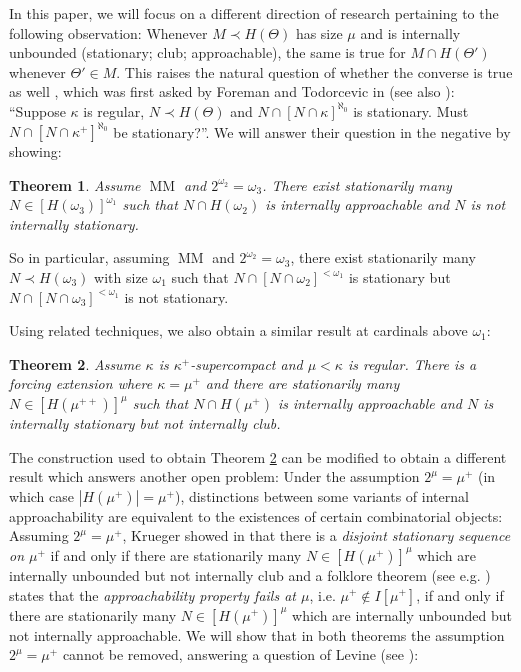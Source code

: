 \documentclass[a4paper]{amsart}
\theoremstyle{definition}
\theoremstyle{remark}
\theoremstyle{plain}
\newtheorem{mythm}{Theorem}
\numberwithin{mydef}{section}
\DeclareMathOperator{\MM}{MM}
\begin{document}
	In this paper, we will focus on a different direction of research pertaining to the following observation: Whenever $M\prec H(\Theta)$ has size $\mu$ and is internally unbounded (stationary; club; approachable), the same is true for $M\cap H(\Theta')$ whenever $\Theta'\in M$. This raises the natural question of whether the converse is true as well , which was first asked by Foreman and Todorcevic in \cite{ForemanTodorLowenheimSkolem} (see also \cite[Question 4.6]{ForemanSurvey}): ``Suppose $\kappa$ is regular, $N\prec H(\Theta)$ and $N\cap[N\cap\kappa]^{\aleph_0}$ is stationary. Must $N\cap[N\cap\kappa^+]^{\aleph_0}$ be stationary?''. We will answer their question in the negative by showing:
	
	\begin{mythm}\label{Thm1}
		Assume $\MM$ and $2^{\omega_2}=\omega_3$. There exist stationarily many $N\in[H(\omega_3)]^{\omega_1}$ such that $N\cap H(\omega_2)$ is internally approachable and $N$ is not internally stationary.
	\end{mythm}
	
	So in particular, assuming $\MM$ and $2^{\omega_2}=\omega_3$, there exist stationarily many $N\prec H(\omega_3)$ with size $\omega_1$ such that $N\cap[N\cap\omega_2]^{<\omega_1}$ is stationary but $N\cap [N\cap\omega_3]^{<\omega_1}$ is not stationary.
	
	Using related techniques, we also obtain a similar result at cardinals above $\omega_1$:
	
	\begin{mythm}\label{Thm2}
		Assume $\kappa$ is $\kappa^+$-supercompact and $\mu<\kappa$ is regular. There is a forcing extension where $\kappa=\mu^+$ and there are stationarily many $N\in[H(\mu^{++})]^{\mu}$ such that $N\cap H(\mu^+)$ is internally approachable and $N$ is internally stationary but not internally club.
	\end{mythm}
	
	The construction used to obtain Theorem \ref{Thm2} can be modified to obtain a different result which answers another open problem: Under the assumption $2^{\mu}=\mu^+$ (in which case $|H(\mu^+)|=\mu^+$), distinctions between some variants of internal approachability are equivalent to the existences of certain combinatorial objects: Assuming $2^{\mu}=\mu^+$, Krueger showed in \cite[Theorem 6.5]{KruegerApplicMSI} that there is a \emph{disjoint stationary sequence on $\mu^+$} if and only if there are stationarily many $N\in[H(\mu^+)]^{\mu}$ which are internally unbounded but not internally club and a folklore theorem (see e.g. \cite[Lemma 1]{CoxFAAppSSR}) states that the \emph{approachability property fails at $\mu$}, i.e. $\mu^+\notin I[\mu^+]$, if and only if there are stationarily many $N\in[H(\mu^+)]^{\mu}$ which are internally unbounded but not internally approachable. We will show that in both theorems the assumption $2^{\mu}=\mu^+$ cannot be removed, answering a question of Levine (see \cite[Question 1]{LevineDisjointStatSeq}):
	
\end{document}
